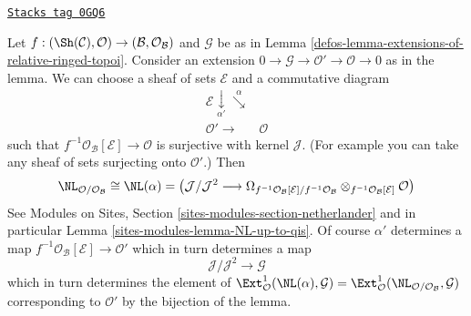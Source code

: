 \begin{remark}
\label{defos-remark-extensions-of-relative-ringed-topoi}
\href{https://stacks.math.columbia.edu/tag/0GQ6}{\texttt{Stacks tag 0GQ6}}

Let $f : (\Sh(\mathcal{C}), \mathcal{O}) \to
(\mathcal{B}, \mathcal{O}_\mathcal{B})$ and $\mathcal{G}$
be as in Lemma \ref{defos-lemma-extensions-of-relative-ringed-topoi}.
Consider an extension
$0 \to \mathcal{G} \to \mathcal{O}' \to \mathcal{O} \to 0$
as in the lemma. We can choose a sheaf of sets $\mathcal{E}$
and a commutative diagram
$$
\begin{array}{cc}\mathcal{E} \underset{\alpha'}{\downarrow}\overset{\alpha}{\searrow} &  \\ \mathcal{O}' \longrightarrow & \mathcal{O}\end{array}
$$
such that $f^{-1}\mathcal{O}_\mathcal{B}[\mathcal{E}] \to \mathcal{O}$
is surjective with kernel $\mathcal{J}$.
(For example you can take any sheaf of sets surjecting
onto $\mathcal{O}'$.) Then
$$
\NL_{\mathcal{O}/\mathcal{O}_\mathcal{B}} \cong \NL(\alpha) =
\left(
\mathcal{J}/\mathcal{J}^2
\longrightarrow
\Omega_{f^{-1}\mathcal{O}_\mathcal{B}[\mathcal{E}]/
f^{-1}\mathcal{O}_\mathcal{B}}
\otimes_{f^{-1}\mathcal{O}_\mathcal{B}[\mathcal{E}]} \mathcal{O}\right)
$$
See Modules on Sites, Section \ref{sites-modules-section-netherlander}
and in particular Lemma \ref{sites-modules-lemma-NL-up-to-qis}.
Of course $\alpha'$ determines a map
$f^{-1}\mathcal{O}_\mathcal{B}[\mathcal{E}] \to \mathcal{O}'$
which in turn determines a map
$$
\mathcal{J}/\mathcal{J}^2 \longrightarrow \mathcal{G}
$$
which in turn determines the element of
$\Ext^1_\mathcal{O}(\NL(\alpha), \mathcal{G}) =
\Ext^1_\mathcal{O}(\NL_{\mathcal{O}/\mathcal{O}_\mathcal{B}}, \mathcal{G})$
corresponding to $\mathcal{O}'$ by the bijection of the lemma.
\end{remark}


